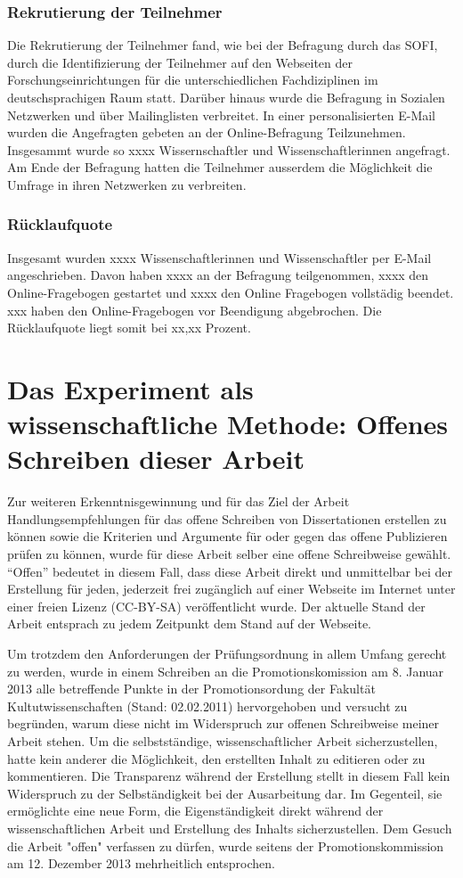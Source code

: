 \subsubsection{Rekrutierung der Teilnehmer}
Die Rekrutierung der Teilnehmer fand, wie bei der Befragung durch das SOFI, durch die Identifizierung der Teilnehmer auf den Webseiten der Forschungseinrichtungen für die unterschiedlichen Fachdiziplinen im deutschsprachigen Raum statt. Darüber hinaus wurde die Befragung in Sozialen Netzwerken und über Mailinglisten verbreitet. In einer personalisierten E-Mail wurden die Angefragten gebeten an der Online-Befragung Teilzunehmen. Insgesammt wurde so xxxx Wissernschaftler und Wissenschaftlerinnen angefragt. Am Ende der Befragung hatten die Teilnehmer ausserdem die Möglichkeit die Umfrage in ihren Netzwerken zu verbreiten.

\subsubsection{Rücklaufquote}
Insgesamt wurden xxxx Wissenschaftlerinnen und Wissenschaftler per E-Mail angeschrieben. Davon haben xxxx an der Befragung teilgenommen, xxxx den Online-Fragebogen gestartet und xxxx den Online Fragebogen vollstädig beendet. xxx haben den Online-Fragebogen vor Beendigung abgebrochen. Die Rücklaufquote liegt somit bei xx,xx Prozent. 

\section{Das Experiment als wissenschaftliche Methode: Offenes Schreiben dieser Arbeit}
Zur weiteren Erkenntnisgewinnung und für das Ziel der Arbeit Handlungsempfehlungen für das offene Schreiben von Dissertationen erstellen zu können sowie die Kriterien und Argumente für oder gegen das offene Publizieren prüfen zu können, wurde für diese Arbeit selber eine offene Schreibweise gewählt. “Offen” bedeutet in diesem Fall, dass diese Arbeit direkt und unmittelbar bei der Erstellung für jeden, jederzeit frei zugänglich auf einer Webseite im Internet unter einer freien Lizenz (CC-BY-SA) veröffentlicht wurde. Der aktuelle Stand der Arbeit entsprach zu jedem Zeitpunkt dem Stand auf der Webseite. 

Um trotzdem den Anforderungen der Prüfungsordnung in allem Umfang gerecht zu werden, wurde in einem Schreiben an die Promotionskomission am 8. Januar 2013 alle betreffende Punkte in der Promotionsordung der Fakultät Kultutwissenschaften (Stand: 02.02.2011) hervorgehoben und versucht zu begründen, warum diese nicht im Widerspruch zur offenen Schreibweise meiner Arbeit stehen. Um die selbstständige, wissenschaftlicher Arbeit sicherzustellen, hatte kein anderer die Möglichkeit, den erstellten Inhalt zu editieren oder zu kommentieren. Die Transparenz während der Erstellung stellt in diesem Fall kein Widerspruch zu der Selbständigkeit bei der Ausarbeitung dar. Im Gegenteil, sie ermöglichte eine neue Form, die Eigenständigkeit direkt während der wissenschaftlichen Arbeit und Erstellung des Inhalts sicherzustellen. Dem Gesuch die Arbeit "offen" verfassen zu dürfen, wurde seitens der Promotionskommission am 12. Dezember 2013 mehrheitlich entsprochen.

